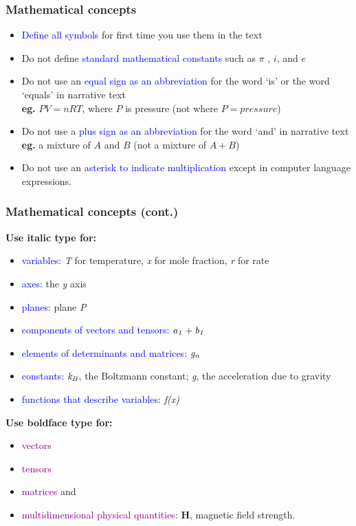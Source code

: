 \documentclass[newPxFont,sthlmFooter]{beamer}
\newcommand{\fs}{\footnotesize}
\begin{document}

\begin{frame}\frametitle{Mathematical concepts}
  \begin{itemize}
  \fs
  \item \textcolor{blue}{Define all symbols} for first time you use them in the text
  \item Do not define \textcolor{blue}{standard mathematical constants} such as $\pi$ , $i$, and $e$
  \item Do not use an \textcolor{blue}{equal sign as an abbreviation} for the word `is' or the word `equals' in narrative text\\
	{\bf eg.} $PV = nRT$, where $P$ is pressure (not where $P = pressure$)
  \item Do not use a \textcolor{blue}{plus sign as an abbreviation} for the word `and' in narrative text\\
	{\bf eg.} a mixture of $A$ and $B$ (not a mixture of $A + B$)
  \item Do not use an \textcolor{blue}{asterisk to indicate multiplication} except in computer language expressions.
  
  \end{itemize}
\end{frame}

\begin{frame}\frametitle{Mathematical concepts (cont.)}
{\fs \bf Use italic type for:}\\
  \begin{itemize}
	\item \fs\textcolor{blue}{variables:} {\it T} for temperature, {\it x} for mole fraction, {\it r} for rate
	\item \fs\textcolor{blue}{axes:} the {\it y} axis
	\item \fs\textcolor{blue}{planes:} plane {\it P}
	\item \fs\textcolor{blue}{components of vectors and tensors:} ${\it a_1 + b_1}$
	\item \fs\textcolor{blue}{elements of determinants and matrices:} ${\it g_n}$
	\item \fs\textcolor{blue}{constants:} ${\it k_B}$, the Boltzmann constant; {\it g}, the acceleration due to gravity
	\item \fs\textcolor{blue}{functions that describe variables:} {\it f(x)}
  \end{itemize}
{\fs \bf Use boldface type for:}\\
  \begin{itemize}
  \fs
	\item \fs\textcolor{purple}{vectors}
	\item \fs\textcolor{purple}{tensors}
	\item \fs\textcolor{purple}{matrices} and
	\item \fs\textcolor{purple}{multidimensional physical quantities:} {\bf H}, magnetic field strength.
  \end{itemize}
\end{frame}
\end{document}
